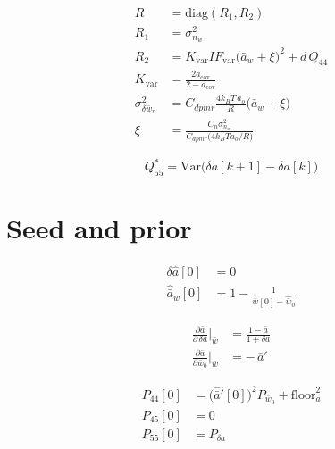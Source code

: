 \documentclass[11pt,a4paper,fontset=none]{ctexart}
\newcommand{\ba}{\bar{a}}
\newcommand{\bw}{\bar{w}}
\begin{document}
\begin{align*}
R &= \mathrm{diag}(R_1, R_2) \\
R_1 &= \sigma^{2}_{n_w} \\
R_2 &= K_{\mathrm{var}} IF_{\mathrm{var}}\bigl(\ba_w+\xi\bigr)^{2} + d\,Q_{44} \\
K_{\mathrm{var}} &= \frac{2a_{\mathrm{cov}}}{2-a_{\mathrm{cov}}} \\
\sigma^{2}_{\delta\bw_r} &= C_{dpmr}\frac{4k_BT\,a_o}{R}\bigl(\ba_w+\xi\bigr) \\
\xi &= \frac{C_n\sigma^{2}_{n_w}}{C_{dpmr}\bigl(4k_BT a_o/R\bigr)}
\end{align*}

\begin{equation*}
Q_{55}^{\ast} = \mathrm{Var}\bigl(\delta a[k+1] - \delta a[k]\bigr)
\end{equation*}

\section*{Seed and prior}

\begin{align*}
\delta\hat{a}[0] &= 0 \\
\hat{\ba}_w[0] &= 1 - \frac{1}{\bw[0]-\hat{\bw}_0}
\end{align*}

\begin{align*}
\frac{\partial\ba}{\partial\,\delta a}\bigg|_{\bw} &= \frac{1-\ba}{1+\delta a} \\
\frac{\partial\ba}{\partial\bw_0}\bigg|_{\bw} &= -\,\ba'
\end{align*}

\begin{align*}
P_{44}[0] &= \bigl(\hat{\ba}'[0]\bigr)^{2} P_{\bw_0} + \mathrm{floor}_a^{2} \\
P_{45}[0] &= 0 \\
P_{55}[0] &= P_{\delta a}
\end{align*}
\end{document}
